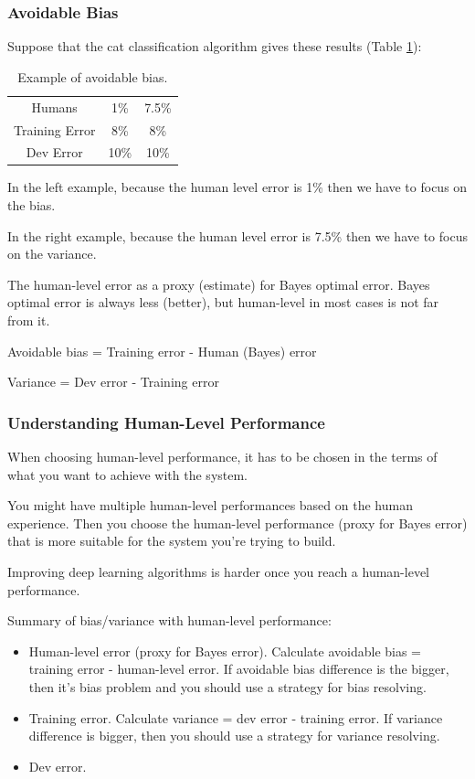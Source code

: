 \subsubsection{Avoidable Bias}
Suppose that the cat classification algorithm gives these results (Table \ref{avoidable-bias}):

\begin{table}[!htbp]
    \centering
    \begin{tabular}{c|c|c}
        \hline
        Humans & 1\% & 7.5\% \\
        Training Error & 8\% & 8\%\\ 
        Dev Error & 10\% & 10\%\\
        \hline
    \end{tabular}
    \caption{Example of avoidable bias.}
    \label{avoidable-bias}
\end{table}

In the left example, because the human level error is 1\% then we have to focus on the bias.

In the right example, because the human level error is 7.5\% then we have to focus on the variance.

The human-level error as a proxy (estimate) for Bayes optimal error. Bayes optimal error is always less (better), but human-level in most cases is not far from it.

Avoidable bias = Training error - Human (Bayes) error

Variance = Dev error - Training error

\subsubsection{Understanding Human-Level Performance}
When choosing human-level performance, it has to be chosen in the terms of what you want to achieve with the system.

You might have multiple human-level performances based on the human experience. Then you choose the human-level performance (proxy for Bayes error) that is more suitable for the system you're trying to build.

Improving deep learning algorithms is harder once you reach a human-level performance.

Summary of bias/variance with human-level performance:

\begin{itemize}
    \item Human-level error (proxy for Bayes error). Calculate avoidable bias = training error - human-level error. If avoidable bias difference is the bigger, then it's bias problem and you should use a strategy for bias resolving.
    \item Training error. Calculate variance = dev error - training error. If variance difference is bigger, then you should use a strategy for variance resolving.
    \item Dev error.
\end{itemize}

